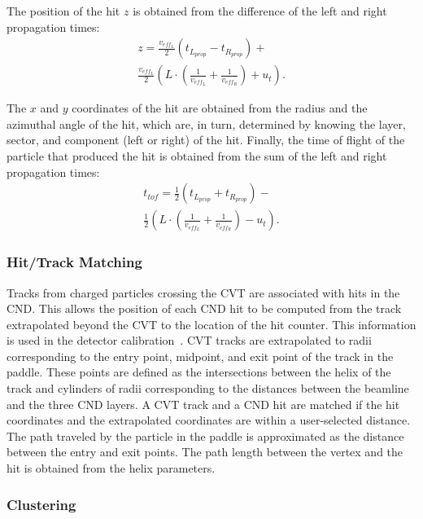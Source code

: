 The position of the hit $z$ is obtained from the difference of the left and right propagation times:
\begin{multline}
  z = \frac{v_{eff_L}}{2} \left(t_{L_{prop}} - t_{R_{prop}} \right) + \\ \frac{v_{eff_L}}{2} \left( L \cdot \left(\frac{1}{v_{eff_L}}
  + \frac{1}{v_{eff_R}}\right) + u_t \right).
\end{multline}

The $x$ and $y$ coordinates of the hit are obtained from the radius and the azimuthal angle of the hit, which are,
in turn, determined by knowing the layer, sector, and component (left or right) of the hit. Finally, the time of flight
of the particle that produced the hit is obtained from the sum of the left and right propagation times:
\begin{multline}
  t_{tof} = \frac{1}{2} \left( t_{L_{prop}} + t_{R_{prop}} \right) - \\
  \frac{1}{2} \left( L \cdot \left( \frac{1}{v_{eff_L}} + \frac{1}{v_{eff_R}} \right)
  -u_t \right).
\end{multline}

\subsubsection{Hit/Track Matching}

Tracks from charged particles crossing the CVT are associated with hits in the CND. This allows the position of
each CND hit to be computed from the track extrapolated beyond the CVT to the location of the hit counter. This
information is used in the detector calibration~\cite{cnd-nim}. CVT tracks are extrapolated to radii corresponding
to the entry point, midpoint, and exit point of the track in the paddle. These points are defined as the
intersections between the helix of the track and cylinders of radii corresponding to the distances between the
beamline and the three CND layers. A CVT track and a CND hit are matched if the hit coordinates and the
extrapolated coordinates are within a user-selected distance. The path traveled by the particle in the paddle is
approximated as the distance between the entry and exit points. The path length between the vertex and the hit is
obtained from the helix parameters.

\subsubsection{Clustering}

